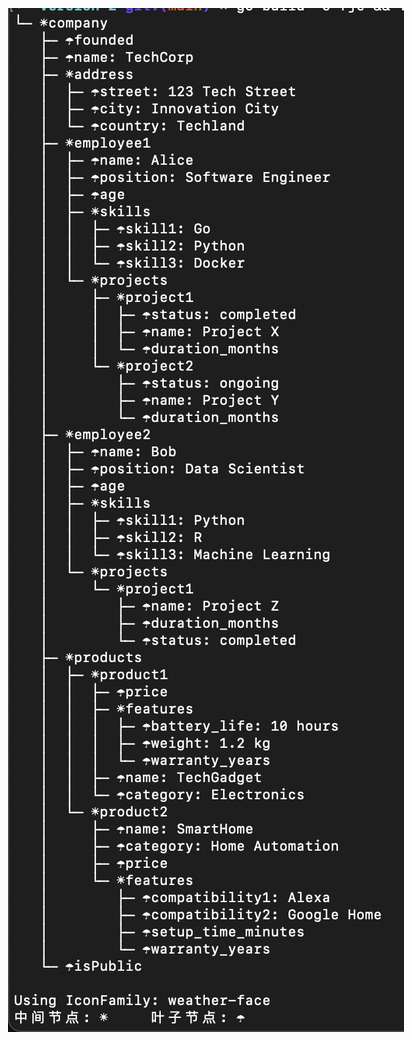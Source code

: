 \documentclass[hyperref,a4paper,UTF8]{ctexart}
\begin{document}
\begin{figure}[htbp]
\centering
\begin{minipage}[t]{0.42\textwidth}
    \centering
    \includegraphics[width=\textwidth]{figures/deep-tre.png}

\end{minipage}
\end{figure}
\end{document}

